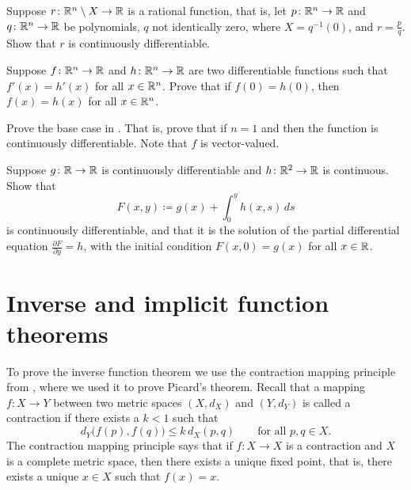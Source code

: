 \begin{exercise}
Suppose $r \colon {\mathbb{R}}^n \setminus X \to {\mathbb{R}}$ is a rational function, that is,
let $p \colon {\mathbb{R}}^n \to {\mathbb{R}}$ and
$q \colon {\mathbb{R}}^n \to {\mathbb{R}}$ be polynomials,
$q$ not identically zero,
where $X = q^{-1}(0)$, and
$r = \frac{p}{q}$.
Show that $r$ is continuously differentiable.
\end{exercise}

\begin{exercise}
Suppose $f \colon {\mathbb{R}}^n \to {\mathbb{R}}$ and $h \colon {\mathbb{R}}^n \to {\mathbb{R}}$ are two 
differentiable functions such that $f'(x) = h'(x)$ for all $x \in {\mathbb{R}}^n$.
Prove that
if $f(0) = h(0)$, then $f(x) = h(x)$ for all $x \in {\mathbb{R}}^n$.
\end{exercise}

\begin{exercise}
Prove the base case
in .  That is, prove that
if $n=1$ and 
 then the function is continuously
differentiable.  Note that $f$ is vector-valued.
\end{exercise}

\begin{exercise}
Suppose $g \colon {\mathbb{R}} \to {\mathbb{R}}$ is continuously differentiable and
$h \colon {\mathbb{R}}^2 \to {\mathbb{R}}$ is continuous.  Show that
\begin{equation*}
F(x,y) \coloneqq g(x) + \int_0^y h(x,s) \,ds
\end{equation*}
is continuously differentiable, and that it is the solution of 
the partial differential equation $\frac{\partial F}{\partial y} = h$,
with the initial condition $F(x,0) = g(x)$ for all $x \in {\mathbb{R}}$.
\end{exercise}



\sectionnewpage
\section{Inverse and implicit function theorems}
\label{sec:svinvfuncthm}


To prove the inverse function theorem we use the contraction mapping
principle from
,
where we used it
to prove Picard's theorem.
Recall that a mapping $f \colon X \to Y$ between two metric
spaces $(X,d_X)$ and $(Y,d_Y)$ is called a contraction 
if there exists a $k < 1$ such that
\begin{equation*}
d_Y\bigl(f(p),f(q)\bigr) \leq k \, d_X(p,q)
\qquad \text{for all } p,q \in X.
\end{equation*}
The contraction mapping principle says that if $f \colon X \to X$
is a contraction and $X$ is a complete metric space,
then there exists a unique fixed point, that is,
there exists a unique $x \in X$ such that $f(x) = x$.

